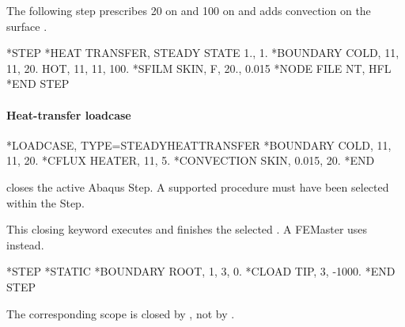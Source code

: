 The following step prescribes 20 on  and 100 on  and adds convection on the surface .

\exampleheading

\begin{inputdeck}
*STEP
*HEAT TRANSFER, STEADY STATE
1., 1.
*BOUNDARY
COLD, 11, 11, 20.
HOT, 11, 11, 100.
*SFILM
SKIN, F, 20., 0.015
*NODE FILE
NT, HFL
*END STEP
\end{inputdeck}

\paragraph*{Heat-transfer loadcase}
\begin{inputdeck}
*LOADCASE, TYPE=STEADYHEATTRANSFER
*BOUNDARY
COLD, 11, 11, 20.
*CFLUX
HEATER, 11, 5.
*CONVECTION
SKIN, 0.015, 20.
*END
\end{inputdeck}


 closes the active Abaqus Step. A supported procedure must have been selected within the Step.

This closing keyword executes and finishes the selected . A FEMaster  uses  instead.

\exampleheading

\begin{inputdeck}
*STEP
*STATIC
*BOUNDARY
ROOT, 1, 3, 0.
*CLOAD
TIP, 3, -1000.
*END STEP
\end{inputdeck}

The corresponding  scope is closed by ,
not by .

